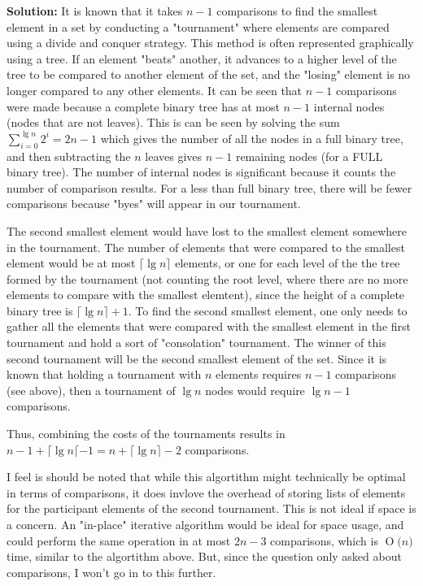 \documentclass[11pts]{article}
\newcommand{\BigO}[1]{\ensuremath{\operatorname{O}\bigl(#1\bigr)}}
\begin{document}
\begin{enumerate}
  \textbf{Solution:} It is known that it takes $n - 1$ comparisons to find
  the smallest element in a set by conducting a "tournament" where elements
  are compared using a divide and conquer strategy. This method is often
  represented graphically using a tree. If an element "beats" another, it
  advances to a higher level of the tree to be compared to another element of
  the set, and the "losing" element is no longer compared to any
  other elements. It can be seen that $n - 1$ comparisons were made because
  a complete binary tree has at most $n - 1$ internal nodes (nodes that are
  not leaves). This is can be seen by solving the sum
  $\sum_{i=0}^{\lg{n}}{2^{i}} = 2n - 1$ which gives the number of
  all the nodes in a full binary tree, and then subtracting the $n$ leaves
  gives $n - 1$ remaining nodes (for a FULL binary tree). The number of
  internal nodes is significant because it counts the number of comparison
  results. For a less than full binary tree, there will be fewer comparisons
  because "byes" will appear in our tournament.

  The second smallest element would have lost to the smallest element somewhere
  in the tournament. The number of elements that were compared to the
  smallest element would be at most $\lceil \lg{n} \rceil$ elements,
  or one for each level of the
  the tree formed by the tournament (not counting the root level, where
  there are no more elements to compare with the smallest elemtent), since the 
  height of a complete binary tree is $\lceil \lg{n} \rceil + 1$.
  To find the second
  smallest element, one only needs to gather all the elements that were
  compared with the smallest element in the first tournament and hold a
  sort of "consolation" tournament. The winner of this second tournament will
  be the second smallest element of the set. Since it is known that holding
  a tournament with $n$ elements requires $n - 1$ comparisons (see above),
  then a tournament of $\lg{n}$ nodes would require $\lg{n} - 1$ comparisons.

  Thus, combining the costs of the tournaments results in
  $n - 1 + \lceil \lg{n} \lceil - 1 = n + \lceil \lg{n} \rceil - 2$
  comparisons.

  I feel is should be noted that while this algortithm might technically
  be optimal in terms of comparisons, it does invlove the overhead of storing
  lists of elements for the participant elements of the second tournament.
  This is not ideal if space is a concern. An "in-place" iterative algorithm
  would be ideal for space usage, and could perform the same operation in
  at most $2n -3$ comparisons, which is \BigO{n} time, similar to
  the algortithm above. But, since the question only asked about comparisons,
  I won't go in to this further.


\end{enumerate}
\end{document}
